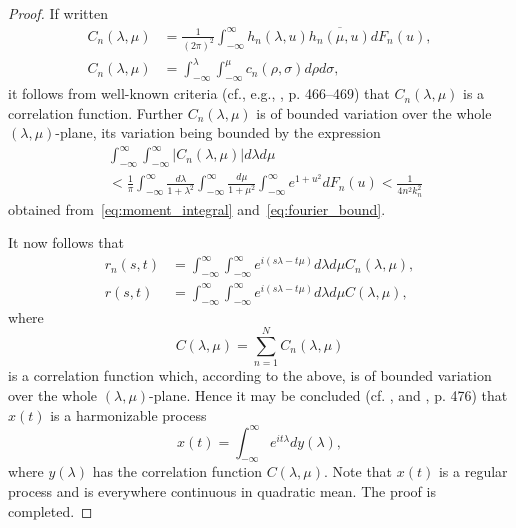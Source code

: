 \documentclass[11pt]{article}
\begin{document}
\begin{proof}
If written
\begin{align}
C_n(\lambda, \mu) &= \frac{1}{(2\pi)^2} \int_{-\infty}^{\infty} h_n(\lambda, u) \overline{h_n(\mu, u)} dF_n(u), \label{eq:spectral_function_n}\\
C_n(\lambda, \mu) &= \int_{-\infty}^{\lambda} \int_{-\infty}^{\mu} c_n(\rho, \sigma) d\rho d\sigma, \label{eq:spectral_density_n}
\end{align}
it follows from well-known criteria (cf., e.g., \cite{loeve1963}, p. 466--469) that $C_n(\lambda, \mu)$ is a correlation function. Further $C_n(\lambda, \mu)$ is of bounded variation over the whole $(\lambda, \mu)$-plane, its variation being bounded by the expression
\begin{align}
&\int_{-\infty}^{\infty} \int_{-\infty}^{\infty} |C_n(\lambda, \mu)| d\lambda d\mu \nonumber \\
&< \frac{1}{\pi} \int_{-\infty}^{\infty} \frac{d\lambda}{1+\lambda^2} \int_{-\infty}^{\infty} \frac{d\mu}{1+\mu^2} \int_{-\infty}^{\infty} e^{1+u^2} dF_n(u) < \frac{1}{4n^2k_n^2} \label{eq:variation_bound}
\end{align}
obtained from~\eqref{eq:moment_integral} and~\eqref{eq:fourier_bound}.

It now follows that
\begin{align}
r_n(s, t) &= \int_{-\infty}^{\infty} \int_{-\infty}^{\infty} e^{i(s\lambda - t\mu)} d\lambda d\mu C_n(\lambda, \mu), \label{eq:harmonizable_n}\\
r(s, t) &= \int_{-\infty}^{\infty} \int_{-\infty}^{\infty} e^{i(s\lambda - t\mu)} d\lambda d\mu C(\lambda, \mu), \label{eq:harmonizable}
\end{align}
where
\begin{equation}
C(\lambda, \mu) = \sum_{n=1}^N C_n(\lambda, \mu)
\label{eq:total_spectral_function}
\end{equation}
is a correlation function which, according to the above, is of bounded variation over the whole $(\lambda, \mu)$-plane. Hence it may be concluded (cf. \cite{cramer1951}, and \cite{loeve1963}, p. 476) that $x(t)$ is a harmonizable process
\begin{equation}
x(t) = \int_{-\infty}^{\infty} e^{it\lambda} dy(\lambda),
\label{eq:harmonizable_representation}
\end{equation}
where $y(\lambda)$ has the correlation function $C(\lambda, \mu)$. Note that $x(t)$ is a regular process and is everywhere continuous in quadratic mean. The proof is completed.
\end{proof}
\end{document}
